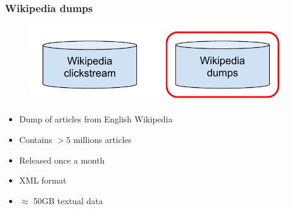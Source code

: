 \begin{frame}
  \frametitle{Wikipedia dumps}
  \begin{figure}[tbph]
    \centering
    \includegraphics[width=0.7\linewidth]{images/datasets_wd}
  \end{figure}
  
  \begin{itemize}
    \item Dump of articles from English Wikipedia
    \item Contains $>5$ millions articles
    \item Released once a month
    \item XML format
    \item $\approx$ 50GB textual data
  \end{itemize}
  
\end{frame}



